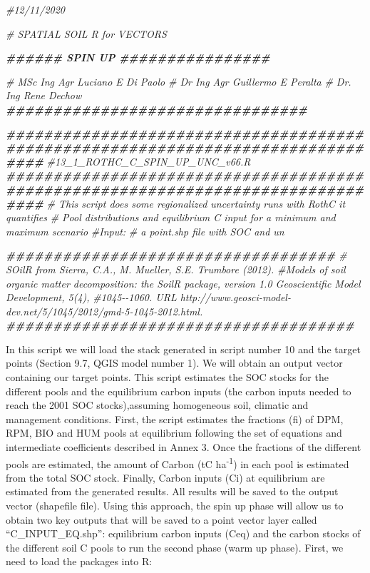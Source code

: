 \documentclass[
  10pt,
  b5paper,
]{book}
\newenvironment{Shaded}{\begin{snugshade}}{\end{snugshade}}
\newcommand{\CommentTok}[1]{\textcolor[rgb]{0.56,0.35,0.01}{\textit{#1}}}
\newcommand{\DocumentationTok}[1]{\textcolor[rgb]{0.56,0.35,0.01}{\textbf{\textit{#1}}}}
\begin{document}
\begin{Shaded}
\begin{Highlighting}[]
\CommentTok{\#12/11/2020}

\CommentTok{\# SPATIAL SOIL R  for VECTORS}

\DocumentationTok{\#\#\#\#\#\# SPIN UP \#\#\#\#\#\#\#\#\#\#\#\#\#\#\#\#}

\CommentTok{\# MSc Ing Agr Luciano E Di Paolo}
\CommentTok{\# Dr Ing Agr Guillermo E Peralta}
\CommentTok{\# Dr. Ing Rene Dechow}
\DocumentationTok{\#\#\#\#\#\#\#\#\#\#\#\#\#\#\#\#\#\#\#\#\#\#\#\#\#\#\#\#\#\#\#\#}

\DocumentationTok{\#\#\#\#\#\#\#\#\#\#\#\#\#\#\#\#\#\#\#\#\#\#\#\#\#\#\#\#\#\#\#\#\#\#\#\#\#\#\#\#\#\#\#\#\#\#\#\#\#\#\#\#\#\#\#\#\#\#\#\#\#\#\#\#\#\#\#\#\#\#\#\#\#\#\#\#\#\#\#\#}
\CommentTok{\#13\_1\_ROTHC\_C\_SPIN\_UP\_UNC\_v66.R}
\DocumentationTok{\#\#\#\#\#\#\#\#\#\#\#\#\#\#\#\#\#\#\#\#\#\#\#\#\#\#\#\#\#\#\#\#\#\#\#\#\#\#\#\#\#\#\#\#\#\#\#\#\#\#\#\#\#\#\#\#\#\#\#\#\#\#\#\#\#\#\#\#\#\#\#\#\#\#\#\#\#\#\#\#}
\CommentTok{\# This script does some regionalized uncertainty runs with RothC it quantifies}
\CommentTok{\# Pool distributions and equilibrium C input for a minimum and maximum scenario}
\CommentTok{\#Input:}
\CommentTok{\#   a point.shp file with SOC and un}


\DocumentationTok{\#\#\#\#\#\#\#\#\#\#\#\#\#\#\#\#\#\#\#\#\#\#\#\#\#\#\#\#\#\#\#\#\#\#\#}
\CommentTok{\# SOilR from Sierra, C.A., M. Mueller, S.E. Trumbore (2012). }
\CommentTok{\#Models of soil organic matter decomposition: the SoilR package, version 1.0 Geoscientific Model Development, 5(4), }
\CommentTok{\#1045{-}{-}1060. URL http://www.geosci{-}model{-}dev.net/5/1045/2012/gmd{-}5{-}1045{-}2012.html.}
\DocumentationTok{\#\#\#\#\#\#\#\#\#\#\#\#\#\#\#\#\#\#\#\#\#\#\#\#\#\#\#\#\#\#\#\#\#\#\#\#\#}
\end{Highlighting}
\end{Shaded}

In this script we will load the stack generated in script number 10 and the target points (Section 9.7, QGIS model number 1). We will obtain an output vector containing our target points. This script estimates the SOC stocks for the different pools and the equilibrium carbon inputs (the carbon inputs needed to reach the 2001 SOC stocks),assuming homogeneous soil, climatic and management conditions.
First, the script estimates the fractions (fi) of DPM, RPM, BIO and HUM pools at equilibrium following the set of equations and intermediate coefficients described in Annex 3. Once the fractions of the different pools are estimated, the amount of Carbon (tC ha\textsuperscript{-1}) in each pool is estimated from the total SOC stock. Finally, Carbon inputs (Ci) at equilibrium are estimated from the generated results.
All results will be saved to the output vector (shapefile file). Using this approach, the spin up phase will allow us to obtain two key outputs that will be saved to a point vector layer called ``C\_INPUT\_EQ.shp'': equilibrium carbon inputs (Ceq) and the carbon stocks of the different soil C pools to run the second phase (warm up phase).
First, we need to load the packages into R:
\end{document}
